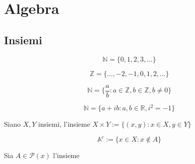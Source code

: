 \chapter{Algebra}
    \section{Insiemi}
        \begin{definition}
            $$\mathbb{N} = \{0,1,2,3,...\}$$
        \end{definition}
        \begin{definition}
            $$\mathbb{Z} = \{...,-2,-1,0,1,2,...\}$$
        \end{definition}
        \begin{definition}
            $$\mathbb{N} = \{\frac{a}{b}: a \in \mathbb{Z}, b \in \mathbb{Z}, b \neq 0 \}$$
        \end{definition}
        \begin{definition}
        \end{definition}
        \begin{definition}
            $$\mathbb{N} = \{a+ib: a,b \in \mathbb{R}, i^2=-1\}$$
        \end{definition}
        \begin{definition}
            Siano $X,Y$ insiemi, l'insieme $X \times Y:= \{(x,y): x \in X, y \in Y\}$
        \end{definition}
        \begin{definition}
            $$\mathbb{A}^c := \{x \in X : x \notin A \}$$
        \end{definition}
        \begin{definition}
            Sia $A \in \mathcal{P}(x)$ l'insieme
        \end{definition}
